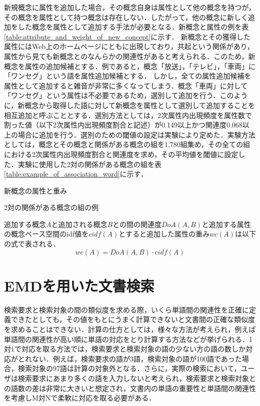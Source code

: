 \documentclass[japanese]{jnlp_1.4}
\begin{document}
新規概念に属性を追加した場合，その概念自身は属性として他の概念を持つが，その概念を属性として持つ概念は存在しない．したがって，他の概念に新しく追加をした概念を属性として追加する手法が必要となる．新概念と属性の例を表\ref{table:attribute_and_weight_of_new_concept}に示す．
新概念とその獲得した属性にはWeb上のホームページにともに出現しており，共起という関係があり，属性から見ても新概念とのなんらかの関連性があると考えられる．このため，新概念を属性の追加候補とする．例であると，概念「放送」，「テレビ」，「車両」に「ワンセグ」という語を属性追加候補とする．
しかし，全ての属性追加候補を属性として追加すると雑音が非常に多くなってしまう．概念「車両」に対して「ワンセグ」という属性は不必要であるため，選別して追加を行う．このように，新概念から取得した語に対して新概念を属性として選別して追加することを相互追加と呼ぶこととする．選別方法としては，2次属性内出現頻度を属性数で割った値（以下2次属性内出現頻度割合と記述）が0.149以上かつ関連度0.068以上の場合に追加を行う．選別のための閾値の設定は実験により定めた．実験方法としては，概念とその概念と関係がある概念の組を1,780組集め，その全ての組における2次属性内出現頻度割合と関連度を求め，その平均値を閾値に設定した．実験に使用した2対の関係がある概念の組を表\ref{table:example_of_association_word}に示す．

\begin{table}[t]
\caption{新概念の属性と重み}
\label{table:attribute_and_weight_of_new_concept}

\end{table}
\begin{table}[t]
\caption{2対の関係がある概念の組の例}
\label{table:example_of_association_word}

\end{table}

追加する概念$A$と追加される概念$B$との間の関連度$DoA(A,B)$と追加する属性の概念ベース空間のidf値を$cidf(A)$とすると追加した属性の重み$wc(A)$は以下の式で表される．
\begin{equation}
 wc(A)=DoA(A,B){\cdot}cidf(A)
\end{equation}


\section{EMDを用いた文書検索}
\label{retrieval_documents_using_EMD}

検索要求と検索対象の間の類似度を求める際，いくら単語間の関連性を正確に定義できたとしても，その値をもとにうまく計算できないと文書間の正確な類似度を求めることはできない．計算の仕方としては，様々な方法が考えられ，例えば単語間の関連性が高い順に単語の対応をとり計算する方法などが挙げられる．1対1で対応を取る方法では，検索要求と検索対象の語の少ない方の語の数しか対応がとれない．例えば，検索要求の語が3語，検索対象の語が100語であった場合，検索対象の97語は計算の対象外となる．さらに，実際の検索において，ユーザは検索要求にあまり多くの語を入力しないと考えられ，検索要求と検索対象との語数の差は非常に大きいと想定され，文書内の単語の重要性と単語間の関連性を考慮しM対Nで柔軟に対応を取る必要がある．
\end{document}
